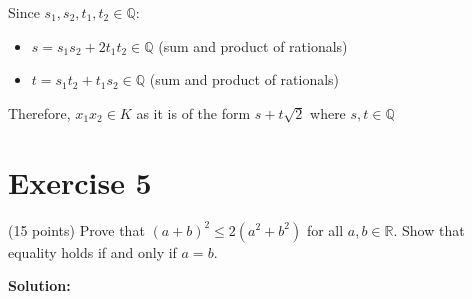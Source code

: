 \documentclass{article}
\begin{document}
Since $s_1, s_2, t_1, t_2 \in \mathbb{Q}$:
\begin{itemize}
\item $s = s_1s_2 + 2t_1t_2 \in \mathbb{Q}$ (sum and product of rationals)
\item $t = s_1t_2 + t_1s_2 \in \mathbb{Q}$ (sum and product of rationals)
\end{itemize}

Therefore, $x_1x_2 \in K$ as it is of the form $s + t\sqrt{2}$ where $s, t \in \mathbb{Q}$

\newpage

\section*{Exercise 5}
(15 points) Prove that $(a + b)^2 \leq 2(a^2 + b^2)$ for all $a,b \in \mathbb{R}$. Show that equality holds if and only if $a = b$.

\textbf{Solution:}
\end{document}
